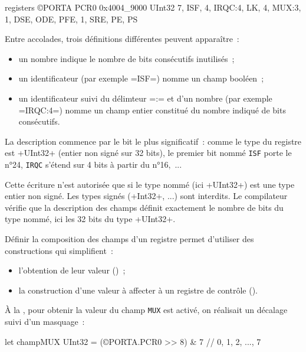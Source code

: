 \begin{OMNIBUS}
registers ©PORTA {
  PCR0 0x4004_9000 UInt32 {
    7, ISF, 4, IRQC:4, LK, 4, MUX:3, 1, DSE, ODE, PFE, 1, SRE, PE, PS
  }
}
\end{OMNIBUS}

Entre accolades, trois définitions différentes peuvent apparaître~:
\begin{itemize}
\item un nombre indique le nombre de bits consécutifs inutilisés~;
\item un identificateur (par exemple \omnibus=ISF=) nomme un champ booléen~;
\item un identificateur suivi du délimteur \omnibus=:= et d'un nombre (par exemple \omnibus=IRQC:4=) nomme un champ entier constitué du nombre indiqué de bits consécutifs.
\end{itemize}

La description commence par le bit le plus significatif~: comme le type du registre est \omnibus+UInt32+ (entier non signé sur 32 bits), le premier bit nommé \texttt{ISF} porte le n°24, \texttt{IRQC} s'étend sur 4 bits à partir du n°16,~...

Cette écriture n'est autorisée que si le type nommé (ici \omnibus+UInt32+) est une type entier non signé. Les types signés (\omnibus+Int32+, ...) sont interdits. Le compilateur vérifie que la description des champs définit exactement le nombre de bits du type nommé, ici les 32 bits du type \omnibus+UInt32+.

Définir la composition des champs d'un registre permet d'utiliser des constructions qui simplifient~:
\begin{itemize}
  \item l'obtention de leur valeur ()~;
  \item la construction d'une valeur à affecter à un registre de contrôle ().
\end{itemize}











À la , pour obtenir la valeur du champ \texttt{MUX} est activé, on réalisait un décalage suivi d'un masquage~:
\begin{OMNIBUS}
let champMUX UInt32 = (©PORTA.PCR0 >> 8) & 7 // 0, 1, 2, ..., 7
\end{OMNIBUS}

